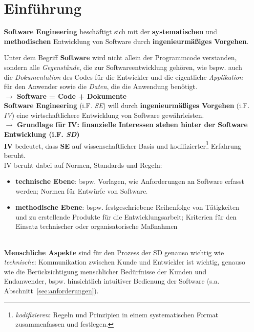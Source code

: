 \section{Einführung}\label{sec:einfuhrung}

\begin{tcolorbox}[title={Software Engineering}]
    \textbf{Software Engineering} beschäftigt sich mit der \textbf{systematischen} und \textbf{methodischen} Entwicklung von Software durch \textbf{ingenieurmäßiges Vorgehen}.
\end{tcolorbox}

\noindent
Unter dem Begriff \textbf{Software} wird nicht allein der Programmcode verstanden, sondern alle \textit{Gegenstände}, die zur Softwareentwicklung gehören, wie bspw. auch die \textit{Dokumentation} des Codes für die Entwickler und die eigentliche \textit{Applikation} für den Anwender sowie die \textit{Daten}, die die Anwendung benötigt.\\
$\rightarrow$ \textbf{Software = Code + Dokumente}\\


\noindent
\textbf{Software Engineering} (i.F. \textit{SE}) will durch \textbf{ingenieurmäßiges Vorgehen} (i.F. \textit{IV}) eine wirtschaftlichere Entwicklung von Software gewährleisten.\\
$\rightarrow$ \textbf{Grundlage für IV: finanzielle Interessen stehen hinter der Software Entwicklung (i.F. \textit{SD})}\\

\noindent
\textbf{IV} bedeutet, dass \textbf{SE} auf wissenschaftlicher Basis und kodifizierter\footnote{
\textit{kodifizieren}: Regeln und Prinzipien in einem systematischen Format zusammenfassen und festlegen.
} Erfahrung beruht.\\

\noindent
IV beruht dabei auf Normen, Standards und Regeln:

\begin{itemize}
    \item\textbf{technische Ebene}: bspw. Vorlagen, wie Anforderungen an Software erfasst werden; Normen für Entwürfe von Software.
    \item \textbf{methodische Ebene}: bspw. festgeschriebene Reihenfolge von Tätigkeiten und zu erstellende Produkte für die Entwicklungsarbeit; Kriterien für den Einsatz technischer oder organisatorische Maßnahmen
\end{itemize}\\

\noindent
\textbf{Menschliche Aspekte} sind für den Prozess der SD genauso wichtig wie \textit{technische}: Kommunikation zwischen Kunde und Entwickler ist wichtig, genauso wie die Berücksichtigung menschlicher Bedürfnisse der Kunden und Endanwender, bspw. hinsichtlich intuitiver Bedienung der Software (s.a. Abschnitt~\ref{sec:anforderungen}).